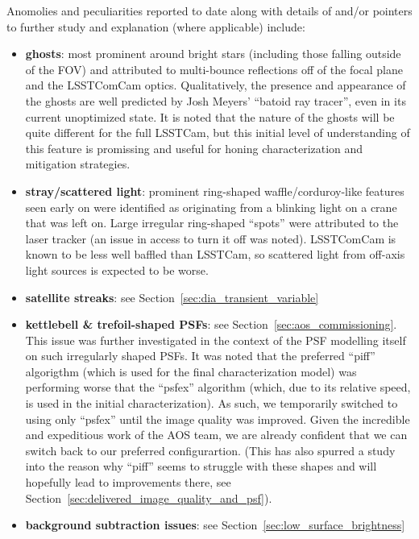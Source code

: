 Anomolies and peculiarities reported to date along with details of and/or pointers
to further study and explanation (where applicable) include:
\begin{itemize}

\item \textbf{ghosts}: most prominent around bright stars (including those falling
  outside of the FOV) and attributed to multi-bounce reflections off of the focal
  plane and the LSSTComCam optics.  Qualitatively, the presence and appearance of 
  the ghosts are well predicted by Josh Meyers' ``batoid ray tracer'', even in its
  current unoptimized state.  It is noted that the nature of the ghosts will be
  quite different for the full LSSTCam, but this initial level of understanding
  of this feature is promissing and useful for honing characterization and
  mitigation strategies.

\item \textbf{stray/scattered light}: prominent ring-shaped waffle/corduroy-like
  features seen early on were identified as originating from a blinking light on a
  crane that was left on. Large irregular ring-shaped ``spots'' were attributed to
  the laser tracker (an issue in access to turn it off was noted). LSSTComCam is 
  known to be less well baffled than LSSTCam, so scattered light from off-axis light 
  sources is expected to be worse.

\item \textbf{satellite streaks}: see Section~\ref{sec:dia_transient_variable}

\item \textbf{kettlebell \& trefoil-shaped PSFs}: see Section~\ref{sec:aos_commissioning}.
  This issue was further investigated in the context of the PSF modelling itself on such
  irregularly shaped PSFs.  It was noted that the preferred ``piff'' algorigthm (which
  is used for the final characterization model) was performing worse that the ``psfex''
  algorithm (which, due to its relative speed, is used in the initial characterization).
  As such, we temporarily switched to using only ``psfex'' until the image quality was
  improved.  Given the incredible and expeditious work of the AOS team, we are already
  confident that we can switch back to our preferred configurartion.  (This has also
  spurred a study into the reason why ``piff'' seems to struggle with these shapes and
  will hopefully lead to improvements there, see
  Section~\ref{sec:delivered_image_quality_and_psf}).

\item \textbf{background subtraction issues}: see Section~\ref{sec:low_surface_brightness}


\end{itemize}
